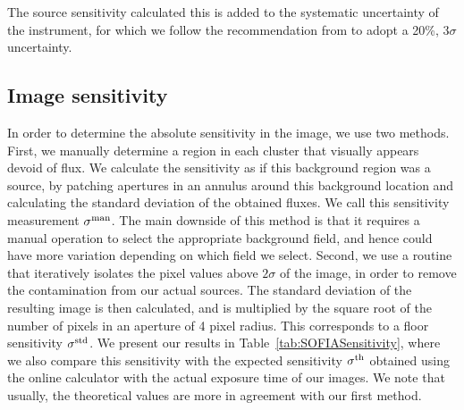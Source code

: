 The source sensitivity calculated this is added to the systematic uncertainty of the instrument, for which we follow the recommendation from \citep{Herter:2012hv} to adopt a 20\%, $3\sigma$ uncertainty. 

\subsection{Image sensitivity}
In order to determine the absolute sensitivity in the image, we use two methods. First, we manually determine a region in each cluster that visually appears devoid of flux. We calculate the sensitivity as if this background region was a source, by patching apertures in an annulus around this background location and calculating the standard deviation of the obtained fluxes. We call this sensitivity measurement $\sigma^\textrm{man}$. The main downside of this method is that it requires a manual operation to select the appropriate background field, and hence could have more variation depending on which field we select. Second, we use a routine that iteratively isolates the pixel values above $2\sigma$ of the image, in order to remove the contamination from our actual sources. The standard deviation of the resulting image is then calculated, and is multiplied by the square root of the number of pixels in an aperture of 4 pixel radius. This corresponds to a floor sensitivity $\sigma^\textrm{std}$. We present our results in Table~\ref{tab:SOFIASensitivity}, where we also compare this sensitivity with the expected sensitivity $\sigma^\textrm{th}$ obtained using the online calculator with the actual exposure time of our images. We note that usually, the theoretical values are more in agreement with our first method. 

